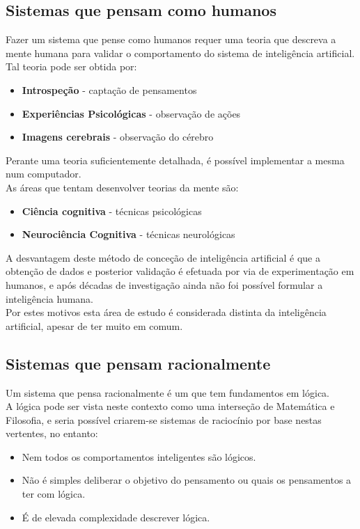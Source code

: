 \documentclass[]{report}
\begin{document}
\subsection{Sistemas que pensam como humanos}
Fazer um sistema que pense como humanos requer uma teoria que descreva a mente humana para validar o comportamento do sistema de inteligência artificial.\\
Tal teoria pode ser obtida por:
\begin{itemize}
\item \textbf{Introspeção} - captação de pensamentos
\item \textbf{Experiências Psicológicas} - observação de ações
\item \textbf{Imagens cerebrais} - observação do cérebro
\end{itemize}
Perante uma teoria suficientemente detalhada, é possível implementar a mesma num computador.\\
As áreas que tentam desenvolver teorias da mente são:
\begin{itemize}
\item \textbf{Ciência cognitiva} - técnicas psicológicas
\item \textbf{Neurociência Cognitiva} - técnicas neurológicas
\end{itemize}
A desvantagem deste método de conceção de inteligência artificial é que a obtenção de dados e posterior validação é efetuada por via de experimentação em humanos, e após décadas de investigação ainda não foi possível formular a inteligência humana.\\
Por estes motivos esta área de estudo é considerada distinta da inteligência artificial, apesar de ter muito em comum.
\subsection{Sistemas que pensam racionalmente}
Um sistema que pensa racionalmente é um que tem fundamentos em lógica.\\
A lógica pode ser vista neste contexto como uma interseção de Matemática e Filosofia, e seria possível criarem-se sistemas de raciocínio por base nestas vertentes, no entanto:
\begin{itemize}
\item Nem todos os comportamentos inteligentes são lógicos.
\item Não é simples deliberar o objetivo do pensamento ou quais os pensamentos a ter com lógica.
\item É de elevada complexidade descrever lógica.
\end{itemize}
\end{document}
